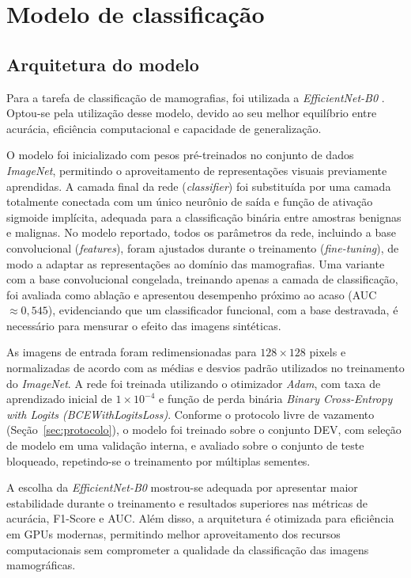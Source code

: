 \documentclass[
	12pt,				%
	openright,			%
	oneside,			%
	a4paper,			%
	tcc,			%
	]{ABNT-DC-UEL}
\begin{document}
\section{Modelo de classificação}

\subsection{Arquitetura do modelo}

Para a tarefa de classificação de mamografias, foi utilizada a \textit{EfficientNet-B0} \cite{tan2019efficientnet}. Optou-se pela utilização desse modelo, devido ao seu melhor equilíbrio entre acurácia, eficiência computacional e capacidade de generalização.

O modelo foi inicializado com pesos pré-treinados no conjunto de dados \textit{ImageNet}, permitindo o aproveitamento de representações visuais previamente aprendidas. A camada final da rede (\textit{classifier}) foi substituída por uma camada totalmente conectada com um único neurônio de saída e função de ativação sigmoide implícita, adequada para a classificação binária entre amostras benignas e malignas. No modelo reportado, todos os parâmetros da rede, incluindo a base convolucional (\textit{features}), foram ajustados durante o treinamento (\textit{fine-tuning}), de modo a adaptar as representações ao domínio das mamografias. Uma variante com a base convolucional congelada, treinando apenas a camada de classificação, foi avaliada como ablação e apresentou desempenho próximo ao acaso (AUC $\approx 0{,}545$), evidenciando que um classificador funcional, com a base destravada, é necessário para mensurar o efeito das imagens sintéticas.

As imagens de entrada foram redimensionadas para $128 \times 128$ pixels e normalizadas de acordo com as médias e desvios padrão utilizados no treinamento do \textit{ImageNet}. A rede foi treinada utilizando o otimizador \textit{Adam}, com taxa de aprendizado inicial de $1 \times 10^{-4}$ e função de perda binária \textit{Binary Cross-Entropy with Logits (BCEWithLogitsLoss)}. Conforme o protocolo livre de vazamento (Seção~\ref{sec:protocolo}), o modelo foi treinado sobre o conjunto DEV, com seleção de modelo em uma validação interna, e avaliado sobre o conjunto de teste bloqueado, repetindo-se o treinamento por múltiplas sementes.

A escolha da \textit{EfficientNet-B0} mostrou-se adequada por apresentar maior estabilidade durante o treinamento e resultados superiores nas métricas de acurácia, F1-Score e AUC. Além disso, a arquitetura é otimizada para eficiência em GPUs modernas, permitindo melhor aproveitamento dos recursos computacionais sem comprometer a qualidade da classificação das imagens mamográficas.
\end{document}
